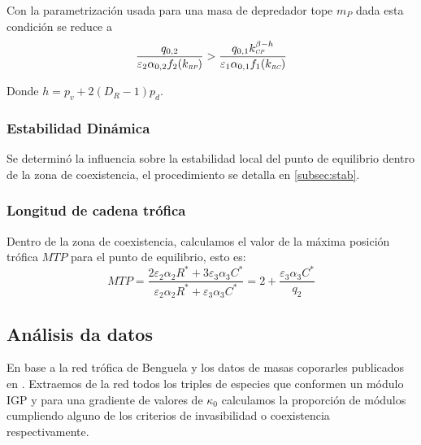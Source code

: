 Con la parametrizaci\'on usada para una masa de depredador tope $m_P$ dada esta condici\'on se reduce a 
\begin{equation}
  \frac{q_{0,2}}{\varepsilon_2 \alpha_{0,2} f_2(k_{\textit{\tiny RP}})} > \frac{q_{0,1} k_{\textit{\tiny CP}}^{\beta-h}}{\varepsilon_{1} \alpha_{0,1} f_1(k_{\textit{\tiny RC}})}
\end{equation}

Donde $ h = p_v + 2(D_R -1) p_d$.

\subsubsection{Estabilidad Din\'amica}
Se determin\'o la influencia sobre la estabilidad local del punto de equilibrio dentro de la zona de coexistencia, el procedimiento se detalla en \ref{subsec:stab}.


\subsubsection{Longitud de cadena tr\'ofica}

Dentro de la zona de coexistencia, calculamos el valor de la m\'axima posici\'on tr\'ofica $MTP$ para el punto de equilibrio, esto es:
\begin{equation}
  MTP = \frac{ 2 \varepsilon_2 \alpha_2 R^* + 3 \varepsilon_3 \alpha_3 C^*}{ \varepsilon_2 \alpha_2 R^* + \varepsilon_3 \alpha_3 C^*} = 2 + \frac{\varepsilon_3 \alpha_3 C^*}{q_2}
\end{equation}

\subsection{An\'alisis da datos}

En base a la red tr\'ofica de Benguela \citep{yodzis1998:localTD} y los datos de masas coporarles publicados en \citet{brose2006:bodysizecr}. Extraemos de la red todos los triples de especies que conformen un m\'odulo IGP y para una gradiente de valores de $\kappa_0$ calculamos la proporci\'on de m\'odulos cumpliendo alguno de los criterios de invasibilidad o coexistencia respectivamente. 

